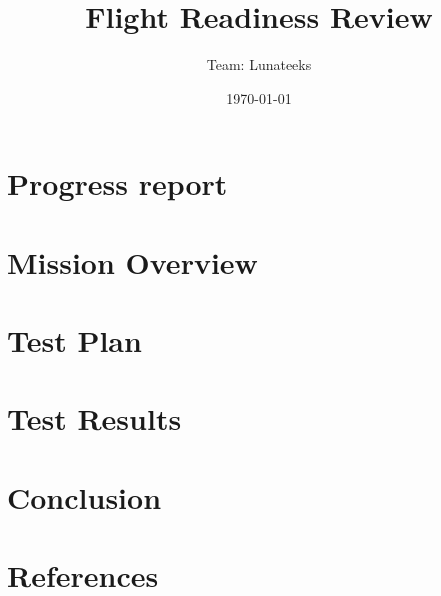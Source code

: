 \documentclass[11pt]{article}
\title{Flight Readiness Review}
\author{Team: Lunateeks}
\date{\today}
\begin{document}
\cansattitle

\tableofcontents
\pagestyle{plain}

\newpage

\section{Progress report}



\section{Mission Overview}



\section{Test Plan}



\section{Test Results}



\section{Conclusion}



\section{References}


\end{document}
